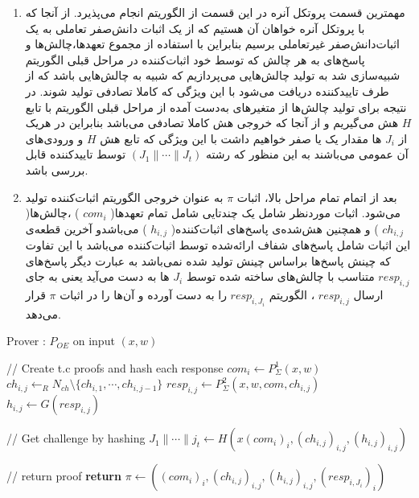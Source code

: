 \begin{enumerate}
\item {
مهمترین قسمت پروتکل آنره در این قسمت از الگوریتم انجام می‌پذیرد. 
از آنجا که با پروتکل آنره خواهان آن هستیم که از یک اثبات دانش‌صفر تعاملی به یک اثبات‌دانش‌صفر غیرتعاملی برسیم بنابراین با استفاده از مجموع تعهد‌ها،چالش‌ها و پاسخ‌های به هر  چالش  که توسط خود اثبات‌کننده در مراحل قبلی الگوریتم شبیه‌سازی شد به تولید چالش‌هایی می‌پردازیم که شبیه به چالش‌هایی باشد که از طرف تاییدکننده دریافت می‌شود با این ویژگی که کاملا تصادفی تولید شوند. در نتیجه برای تولید چالش‌ها از متغیرهای به‌دست آمده از مراحل قبلی الگوریتم با تابع
$H$
هش می‌گیریم و از آنجا که خروجی هش کاملا تصادفی می‌باشد بنابراین در هریک از 
$J_i$
ها مقدار یک یا صفر خواهیم داشت با این ویژگی که تابع هش
$H$
و ورودی‌های آن عمومی می‌باشند به این منظور که رشته 
$ (J_1 \parallel \cdots  \parallel J_t) $
توسط تاییدکننده قابل بررسی باشد.
}
\item {
بعد از اتمام تمام مراحل بالا، اثبات 
$\pi$
به عنوان خروجی الگوریتم اثبات‌کننده تولید می‌شود. اثبات موردنظر شامل یک چندتایی شامل تمام تعهدها(
$com_i$
)
،چالش‌ها(
$ch_{i,j}$
)
و همچنین هش‌شده‌ی پاسخ‌های اثبات‌کننده(
$h_{i,j}$
)
می‌باشدو آخرین قطعه‌ی این اثبات شامل پاسخ‌های شفاف ارائه‌شده توسط اثبات‌کننده می‌باشد با این تفاوت که چینش پاسخ‌ها براساس چینش تولید شده نمی‌باشد به عبارت دیگر پاسخ‌های 
$resp_{i,j}$
متناسب با چالش‌های ساخته شده توسط 
$J_i$
ها به دست می‌آید یعنی به جای ارسال 
$resp_{i,j}$
، الگوریتم
$resp_{i,J_i}$
را به دست آورده و آن‌ها را در اثبات
$\pi$
قرار می‌دهد.
}
	
\end{enumerate}

\begin{algorithm}\label{alg_prover}
	\caption{Prover : $P_{OE}$ on input $(x,w)$}
	\begin{latin}
		\begin{algorithmic}[1]
			\State // Create t.c proofs and hash each response
			\State $com_i \leftarrow P_{\Sigma}^{1}(x,w)$
			\State $ch_{i,j} \leftarrow_{R} N_{ch} \setminus \{ch_{i,1} , \cdots , ch_{i,j-1} \}$
			\State $resp_{i,j} \leftarrow P_{\Sigma}^2 (x,w,com,ch_{i,j})$
			\State $h_{i,j} \leftarrow G(resp_{i,j})$ 
			\EndFor 
			\EndFor
			
			\State // Get challenge by hashing
			\State $ J_1 \parallel \cdots \parallel j_t \leftarrow H(x(com_i)_i , (ch_{i,j})_{i,j} , (h_{i,j})_{i,j}   ) $ 
			
			\State // return proof
			\State \textbf{return} $\pi \leftarrow ( (com_i)_i , (ch_{i,j})_{i,j} , (h_{i,j})_{i,j} , (resp_{i,J_i})_i  )$ 
		\end{algorithmic}
	\end{latin}
\end{algorithm}

